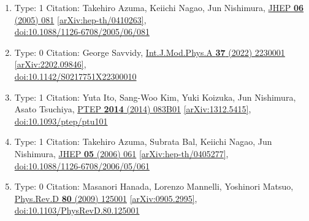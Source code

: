 \documentclass[a4paper,10pt]{article}
\begin{document}
\begin{enumerate}
\begin{enumerate}
  \item Type: 1 Citation: Takehiro Azuma, Keiichi Nagao, Jun Nishimura, \href{https://www.doi.org/10.1088/1126-6708/2005/06/081}{JHEP {\bf 06} (2005) 081}  \href{https://arxiv.org/abs/hep-th/0410263}{[arXiv:hep-th/0410263]},\\\href{https://www.doi.org/10.1088/1126-6708/2005/06/081}{doi:10.1088/1126-6708/2005/06/081}
  \item Type: 0 Citation: George Savvidy, \href{https://www.doi.org/10.1142/S0217751X22300010}{Int.J.Mod.Phys.A {\bf 37} (2022) 2230001}  \href{https://arxiv.org/abs/2202.09846}{[arXiv:2202.09846]},\\\href{https://www.doi.org/10.1142/S0217751X22300010}{doi:10.1142/S0217751X22300010}
  \item Type: 1 Citation: Yuta Ito, Sang-Woo Kim, Yuki Koizuka, Jun Nishimura, Asato Tsuchiya, \href{https://www.doi.org/10.1093/ptep/ptu101}{PTEP {\bf 2014} (2014) 083B01}  \href{https://arxiv.org/abs/1312.5415}{[arXiv:1312.5415]},\\\href{https://www.doi.org/10.1093/ptep/ptu101}{doi:10.1093/ptep/ptu101}
  \item Type: 1 Citation: Takehiro Azuma, Subrata Bal, Keiichi Nagao, Jun Nishimura, \href{https://www.doi.org/10.1088/1126-6708/2006/05/061}{JHEP {\bf 05} (2006) 061}  \href{https://arxiv.org/abs/hep-th/0405277}{[arXiv:hep-th/0405277]},\\\href{https://www.doi.org/10.1088/1126-6708/2006/05/061}{doi:10.1088/1126-6708/2006/05/061}
  \item Type: 0 Citation: Masanori Hanada, Lorenzo Mannelli, Yoshinori Matsuo, \href{https://www.doi.org/10.1103/PhysRevD.80.125001}{Phys.Rev.D {\bf 80} (2009) 125001}  \href{https://arxiv.org/abs/0905.2995}{[arXiv:0905.2995]},\\\href{https://www.doi.org/10.1103/PhysRevD.80.125001}{doi:10.1103/PhysRevD.80.125001}

\end{enumerate}
\end{enumerate}
\end{document}
